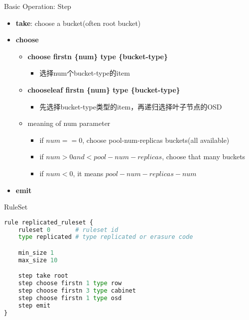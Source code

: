 \begin{frame}{Basic Operation: Step}
    \begin{itemize}
        \item \textbf{take}: choose a bucket(often root bucket)
        \item \textbf{choose}
            \begin{itemize}
                \item \textbf{choose firstn \{num\} type \{bucket-type\}}
                    \begin{itemize}
                        \item 选择num个bucket-type的item
                    \end{itemize}
                \item \textbf{chooseleaf firstn \{num\} type \{bucket-type\}}
                    \begin{itemize}
                        \item 先选择bucket-type类型的item，再递归选择叶子节点的OSD
                    \end{itemize}
                \item meaning of num parameter
                    \begin{itemize}
                        \item if $num == 0$, choose pool-num-replicas buckets(all available)
                        \item if $num > 0 and < pool-num-replicas$, choose that many buckets
                        \item if $num < 0$, it means $pool-num-replicas - num$
                    \end{itemize}
            \end{itemize}
        \item \textbf{emit} 
    \end{itemize} 
\end{frame}

\begin{frame}[fragile]{RuleSet}
\begin{lstlisting}[language=python]
rule replicated_ruleset {
    ruleset 0       # ruleset id
    type replicated # type replicated or erasure code

    min_size 1
    max_size 10

    step take root
    step choose firstn 1 type row
    step choose firstn 3 type cabinet
    step choose firstn 1 type osd
    step emit
}
\end{lstlisting}
\end{frame}

